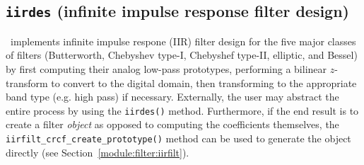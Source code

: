 % 
%
\subsection{{\tt iirdes} (infinite impulse response filter design)}
\label{module:filter:iirdes}
\liquid\ implements infinite impulse respone (IIR) filter design for the
five major classes of filters
(Butterworth, Chebyshev type-I, Chebyshef type-II, elliptic, and Bessel)
by
first computing their analog low-pass prototypes, performing a bilinear
$z$-transform to convert to the digital domain, then transforming to the
appropriate band type (e.g. high pass) if necessary.
Externally, the user may abstract the entire process by using the
{\tt iirdes()} method.
Furthermore, if the end result is to create a filter {\em object} as
opposed to computing the coefficients themselves, the
{\tt iirfilt\_crcf\_create\_prototype()} method can be used to generate
the object directly
(see Section~\ref{module:filter:iirfilt}).

